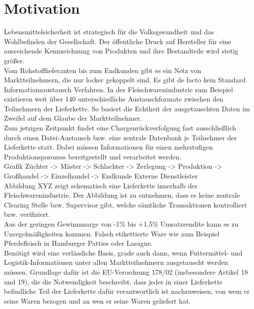 \section{Motivation}

Lebensmittelsicherheit ist strategisch für die Volksgesundheit und das Wohlbefinden der Gesellschaft. Der öffentliche Druck auf Hersteller für eine ausreichende Kennzeichnung von Produkten und ihre Bestandteile wird stetig größer.\\

Vom Rohstofflieferanten bis zum Endkunden gibt es ein Netz von Marktteilnehmern, die nur locker gekoppelt sind. Es gibt de facto kein Standard Informationsaustausch Verfahren. In der Fleischwarenindustrie zum Beispiel existieren weit über 140 unterschiedliche Austauschformate zwischen den Teilnehmern der Lieferkette. So basiert die Echtheit der ausgetauschten Daten im Zweifel auf dem Glaube der Marktteilnehmer.\\

Zum jetzigen Zeitpunkt findet eine Chargenrückverfolgung fast ausschließlich durch einen Datei-Austausch bzw. eine zentrale Datenbank je Teilnehmer der Lieferkette statt. Dabei müssen Informationen für einen mehrstufigen Produktionsporozess bereitgestellt und verarbeitet werden.\\

Grafik Züchter -> Mäster -> Schlachter -> Zerlegung -> Produktion -> Großhandel -> Einzelhandel -> Endkunde
Externe Dienstleister\\

Abbildung XYZ zeigt schematisch eine Lieferkette innerhalb der Fleischwarenindustrie. Der Abbildung ist zu entnehmen, dass es keine zentrale \glqq Clearing Stelle\grqq{} bzw. Supervisor gibt, welche sämtliche Transaktionen kontrolliert bzw. verifiziert.\\

Aus der geringen Gewinnmarge von -1\% bis +1,5\% Umsatzrendite kann es zu Unregelmäßigkeiten kommen.\cite{CIOWSCE2019}\cite{CIOMuehlenhof2019} Falsch etikettierte Ware wie zum Beispiel Pferdefleisch in Hamburger Patties oder Lasagne.\cite[vgl.]{Bundespartei}\\

Benötigt wird eine verlässliche Basis, grade auch dann, wenn Futtermittel- und Logistik-Informationen unter allen Marktteilnehmern ausgetauscht werden müssen. Grundlage dafür ist die EU-Verordnung 178/02 (insbesondere Artikel 18 und 19), die die Notwendigkeit beschreibt, dass jeder in einer Lieferkette befindliche Teil der Lieferkette dafür verantwortlich ist nachzuweisen, von wem er seine Waren bezogen und an wen er seine Waren geliefert hat.\cite[vgl.]{EU2002}\\

